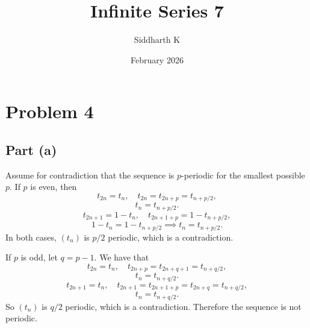\documentclass{article}
\title{Infinite Series 7}
\author{Siddharth K}
\date{February 2026}
\begin{document}
\maketitle

\section*{Problem 4}
\subsection*{Part (a)}
Assume for contradiction that the sequence is $p$-periodic for the smallest possible $p$. If $p$ is even, then
$$t_{2n} = t_n, \quad t_{2n} = t_{2n + p} = t_{n + p/2},$$
$$t_n =t_{n + p/2}.$$
$$t_{2n + 1} = 1 - t_n, \quad t_{2n + 1 + p} = 1 - t_{n + p/2},$$
$$1 - t_n = 1 - t_{n + p/2} \implies t_n = t_{n + p/2}.$$
In both cases, $(t_n)$ is $p/2$ periodic, which is a contradiction.

If $p$ is odd, let $q = p - 1$. We have that
$$t_{2n} = t_n, \quad t_{2n + p} = t_{2n + q + 1} = t_{n + q/2},$$
$$t_n = t_{n + q/2}.$$
$$t_{2n + 1} = t_n, \quad t_{2n + 1} = t_{2n + 1 + p} = t_{2n + q} = t_{n + q/2},$$
$$t_n = t_{n + q/2}.$$
So $(t_n)$ is $q/2$ periodic, which is a contradiction. Therefore the sequence is not periodic.
\end{document}
